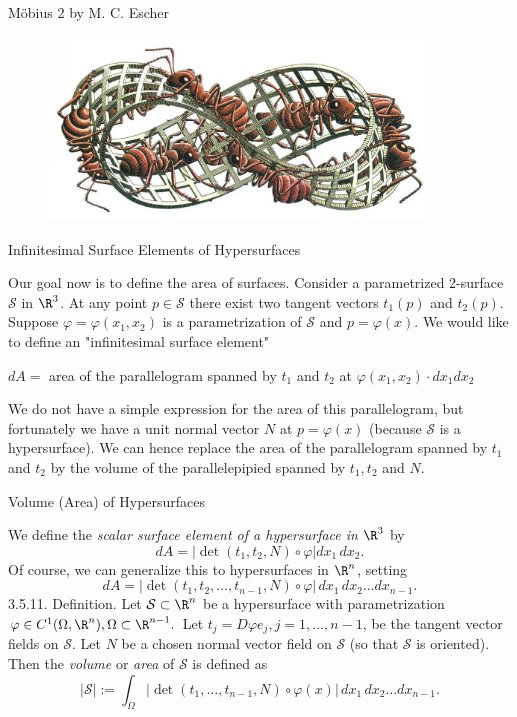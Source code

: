 \documentclass[smaller,hyperref={CJKbookmarks=true}]{beamer}
\begin{document}
\begin{frame}[t]{M\"{o}bius 2 by M. C. Escher}
\begin{figure}
  \centering
  \includegraphics[width=0.9\textwidth]{74.jpg}

\end{figure}
\end{frame}
\begin{frame}[c]{Infinitesimal Surface Elements of Hypersurfaces}
\begin{spacing}{1.1}
Our goal now is to define the area of surfaces. Consider a parametrized
2-surface $\mathcal{S}$ in $\R^3$. At any point $p\in\mathcal{S}$ there exist two tangent vectors $t_1(p)$ and $t_2(p)$. Suppose $\varphi=\varphi(x_1,x_2)$ is a parametrization of $\mathcal{S}$ and $p=\varphi(x)$. We would like to define an "infinitesimal surface element"
\begin{center}
  $dA=$ area of the parallelogram spanned by $t_1$ and $t_2$ at $\varphi(x_1,x_2)\cdot dx_1dx_2$
\end{center}
We do not have a simple expression for the area of this parallelogram, but
fortunately we have a unit normal vector $N$ at $p=\varphi(x)$ (because $\mathcal{S}$ is a hypersurface). We can hence replace the area of the parallelogram spanned
by $t_1$ and $t_2$ by the volume of the parallelepipied spanned by $t_1,t_2$ and $N$.
\end{spacing}
\end{frame}
\begin{frame}[t]{Volume (Area) of Hypersurfaces}
\begin{spacing}{1}
We define the \emph{scalar surface element of a hypersurface in $\R^3$} by
\[dA=|\det(t_1,t_2,N)\circ\varphi|dx_1\,dx_2.\]
Of course, we can generalize this to hypersurfaces in $\R^n$, setting
\[dA=|\det(t_1,t_2,\ldots,t_{n-1},N)\circ
\varphi|\,dx_1\,dx_2\ldots dx_{n-1}.\]
\alert{3.5.11. Definition.} Let $\mathcal{S}\subset\R^n$ be a hypersurface with parametrization $\varphi\in C^1(\Omega,\R^n),\Omega\subset\R^{n-1}.$ Let $t_j=D\varphi e_j,j=1,\ldots,n-1$, be the tangent vector fields on $\mathcal{S}$. Let $N$ be a chosen normal vector field on $\mathcal{S}$ (so that $\mathcal{S}$ is oriented). Then the \emph{volume} or \emph{area} of $\mathcal{S}$ is defined as
\[|\mathcal{S}|:=\int_\Omega|\det(t_1,\ldots,t_{n-1},N)
\circ\varphi(x)|\,dx_1\,dx_2\ldots dx_{n-1}.\]
\end{spacing}
\end{frame}
\end{document}
